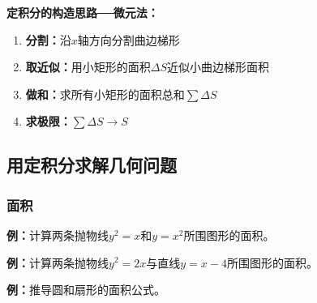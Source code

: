 {\bf 定积分的构造思路──微元法：}

\begin{enumerate}
  \item {\bf 分割：}沿$x$轴方向分割曲边梯形 
  \item {\bf 取近似：}用小矩形的面积$\Delta S$近似小曲边梯形面积 
  \item {\bf 做和：}求所有小矩形的面积总和$\sum \Delta S$ 
  \item {\bf 求极限：}$\sum \Delta S\to S$
\end{enumerate}

\begin{center}
\end{center}

\subsection{用定积分求解几何问题}

\subsubsection{面积}

{\bf 例：}计算两条抛物线$y^2=x$和$y=x^2$所围图形的面积。

{\bf 例：}计算两条抛物线$y^2=2x$与直线$y=x-4$所围图形的面积。

{\bf 例：}推导圆和扇形的面积公式。

